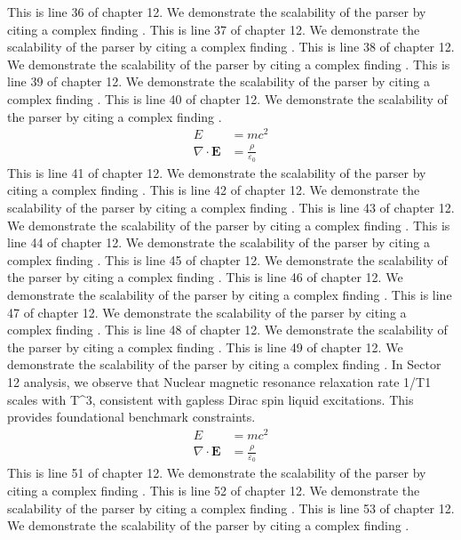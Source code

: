 This is line 36 of chapter 12. We demonstrate the scalability of the parser by citing a complex finding \cite{ref12_36}.
This is line 37 of chapter 12. We demonstrate the scalability of the parser by citing a complex finding \cite{ref12_37}.
This is line 38 of chapter 12. We demonstrate the scalability of the parser by citing a complex finding \cite{ref12_38}.
This is line 39 of chapter 12. We demonstrate the scalability of the parser by citing a complex finding \cite{ref12_39}.
This is line 40 of chapter 12. We demonstrate the scalability of the parser by citing a complex finding \cite{ref12_40}.
\begin{align*}
  E &= mc^2 \\
  \nabla \cdot \mathbf{E} &= \frac{\rho}{\varepsilon_0}
\end{align*}
This is line 41 of chapter 12. We demonstrate the scalability of the parser by citing a complex finding \cite{ref12_41}.
This is line 42 of chapter 12. We demonstrate the scalability of the parser by citing a complex finding \cite{ref12_42}.
This is line 43 of chapter 12. We demonstrate the scalability of the parser by citing a complex finding \cite{ref12_43}.
This is line 44 of chapter 12. We demonstrate the scalability of the parser by citing a complex finding \cite{ref12_44}.
This is line 45 of chapter 12. We demonstrate the scalability of the parser by citing a complex finding \cite{ref12_45}.
This is line 46 of chapter 12. We demonstrate the scalability of the parser by citing a complex finding \cite{ref12_46}.
This is line 47 of chapter 12. We demonstrate the scalability of the parser by citing a complex finding \cite{ref12_47}.
This is line 48 of chapter 12. We demonstrate the scalability of the parser by citing a complex finding \cite{ref12_48}.
This is line 49 of chapter 12. We demonstrate the scalability of the parser by citing a complex finding \cite{ref12_49}.
In Sector 12 analysis, we observe that Nuclear magnetic resonance relaxation rate 1/T1 scales with T^3, consistent with gapless Dirac spin liquid excitations. This provides foundational benchmark constraints.
\begin{align*}
  E &= mc^2 \\
  \nabla \cdot \mathbf{E} &= \frac{\rho}{\varepsilon_0}
\end{align*}
This is line 51 of chapter 12. We demonstrate the scalability of the parser by citing a complex finding \cite{ref12_51}.
This is line 52 of chapter 12. We demonstrate the scalability of the parser by citing a complex finding \cite{ref12_52}.
This is line 53 of chapter 12. We demonstrate the scalability of the parser by citing a complex finding \cite{ref12_53}.
